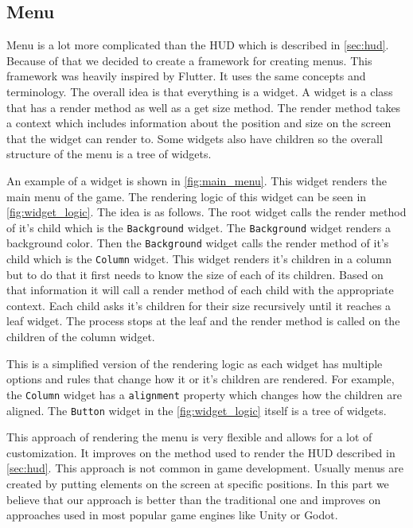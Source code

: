 \subsection*{Menu} \label{sec:menu}
Menu is a lot more complicated than the HUD which is described in \autoref*{sec:hud}.
Because of that we decided to create a framework for creating menus.
This framework was heavily inspired by Flutter.
It uses the same concepts and terminology.
The overall idea is that everything is a widget.
A widget is a class that has a render method as well as a get size method.
The render method takes a context which includes information about the position and size on the screen that the widget can render to.
Some widgets also have children so the overall structure of the menu is a tree of widgets.

An example of a widget is shown in \autoref*{fig:main_menu}.
This widget renders the main menu of the game.
The rendering logic of this widget can be seen in \autoref*{fig:widget_logic}.
The idea is as follows.
The root widget calls the render method of it's child which is the \texttt{Background} widget.
The \texttt{Background} widget renders a background color.
Then the \texttt{Background} widget calls the render method of it's child which is the \texttt{Column} widget.
This widget renders it's children in a column but to do that it first needs to know the size of each of its children.
Based on that information it will call a render method of each child with the appropriate context.
Each child asks it's children for their size recursively until it reaches a leaf widget.
The process stops at the leaf and the render method is called on the children of the column widget.

This is a simplified version of the rendering logic as each widget has multiple options and rules that change how it or it's children are rendered.
For example, the \texttt{Column} widget has a \texttt{alignment} property which changes how the children are aligned.
The \texttt{Button} widget in the \autoref*{fig:widget_logic} itself is a tree of widgets.

This approach of rendering the menu is very flexible and allows for a lot of customization.
It improves on the method used to render the HUD described in \autoref*{sec:hud}.
This approach is not common in game development.
Usually menus are created by putting elements on the screen at specific positions. %
In this part we believe that our approach is better than the traditional one and improves on approaches used in most popular game engines like Unity or Godot.

